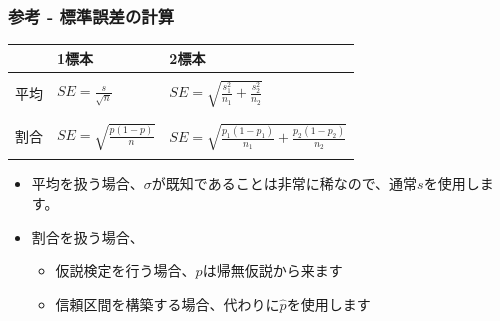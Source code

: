 \begin{frame}
\frametitle{参考 - 標準誤差の計算}

\begin{center}
\begin{tabular}{l | l | l}
			& 1標本					& 2標本 \\
\hline
& & \\
平均		& $SE = \frac{s}{\sqrt{n}}$			& $SE = \sqrt{ \frac{s_1^2}{n_1} + \frac{s_2^2}{n_2}}$ \\
& & \\
\hline
& & \\
割合		& $SE = \sqrt{ \frac{p(1-p)}{n} }$	& $SE = \sqrt{ \frac{p_1(1-p_1)}{n_1} + \frac{p_2(1-p_2)}{n_2} }$	 \\
& & \\
\end{tabular}
\end{center}

\begin{itemize}

\item 平均を扱う場合、$\sigma$が既知であることは非常に稀なので、通常$s$を使用します。

\item 割合を扱う場合、
\begin{itemize}
\item 仮説検定を行う場合、$p$は帰無仮説から来ます
\item 信頼区間を構築する場合、代わりに$\hat{p}$を使用します
\end{itemize}

\end{itemize}

\end{frame}

